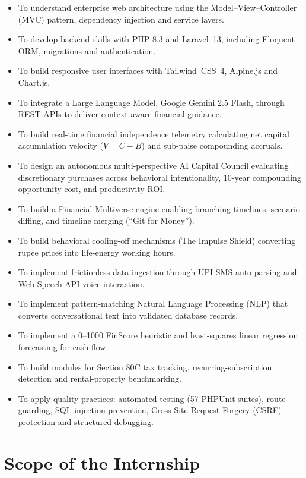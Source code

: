 \documentclass[12pt,a4paper]{report}
\newcommand{\LV}{Laravel~13}
\newcommand{\TW}{Tailwind~CSS~4}
\begin{document}
\begin{itemize}[leftmargin=*]
    \item To understand enterprise web architecture using the Model--View--Controller (MVC) pattern, dependency injection and service layers.
    \item To develop backend skills with PHP 8.3 and \LV{}\cite{laravel,php83}, including Eloquent ORM, migrations and authentication.
    \item To build responsive user interfaces with \TW{}\cite{tailwind}, Alpine.js\cite{alpine} and Chart.js\cite{chartjs}.
    \item To integrate a Large Language Model, Google Gemini 2.5 Flash\cite{gemini}, through REST APIs to deliver context-aware financial guidance.
    \item To build real-time financial independence telemetry calculating net capital accumulation velocity ($V = C - B$) and sub-paise compounding accruals.
    \item To design an autonomous multi-perspective AI Capital Council evaluating discretionary purchases across behavioral intentionality, 10-year compounding opportunity cost, and productivity ROI.
    \item To build a Financial Multiverse engine enabling branching timelines, scenario diffing, and timeline merging (``Git for Money'').
    \item To build behavioral cooling-off mechanisms (The Impulse Shield) converting rupee prices into life-energy working hours.
    \item To implement frictionless data ingestion through UPI SMS auto-parsing and Web Speech API voice interaction.
    \item To implement pattern-matching Natural Language Processing (NLP) that converts conversational text into validated database records.
    \item To implement a 0--1000 FinScore heuristic and least-squares linear regression forecasting for cash flow.
    \item To build modules for Section 80C tax tracking, recurring-subscription detection and rental-property benchmarking.
    \item To apply quality practices: automated testing (57 PHPUnit suites), route guarding, SQL-injection prevention, Cross-Site Request Forgery (CSRF) protection and structured debugging.
\end{itemize}


\section{Scope of the Internship}\label{s13}
\end{document}
